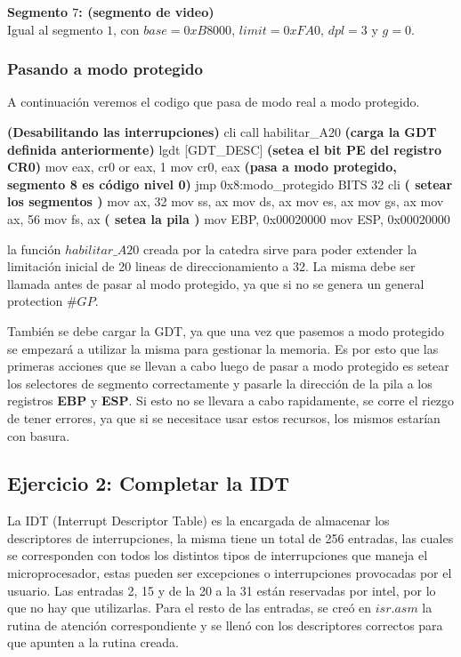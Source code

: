 \documentclass[a4paper,10pt,twoside]{article}
\newenvironment{pseudocodigo}
    {\vspace{0.5em} \begin{algorithmic}}
    {\end{algorithmic} \vspace{0.5em}}
\begin{document}
\textbf{Segmento $7$: (segmento de video)} \\
Igual al segmento $1$, con $base = 0xB8000$, $limit = 0xFA0$, $dpl = 3$ y $g = 0$. \\


\subsubsection{Pasando a modo protegido}

A continuación veremos el codigo que pasa de modo real a modo protegido.

\begin{pseudocodigo}
  \STATE
  \STATE \textbf{(Desabilitando las interrupciones)}
  \STATE cli
  \STATE
  \STATE call habilitar\_A20
  \STATE
  \STATE \textbf{(carga la GDT definida anteriormente)}
  \STATE lgdt [GDT\_DESC]
  \STATE
  \STATE \textbf{(setea el bit PE del registro CR0)}
  \STATE mov eax, cr0
  \STATE or eax, 1
  \STATE mov cr0, eax
  \STATE
  \STATE \textbf{(pasa a modo protegido, segmento 8 es código nivel 0)}
  \STATE jmp 0x8:modo\_protegido
  \STATE BITS 32
  \STATE cli
  \STATE 
  \STATE \textbf{( setear los segmentos )}
  \STATE mov ax, 32
  \STATE mov ss, ax
  \STATE mov ds, ax
  \STATE mov es, ax
  \STATE mov gs, ax
  \STATE mov ax, 56
  \STATE mov fs, ax
  \STATE 
  \STATE \textbf{( setea la pila )}
  \STATE mov EBP, 0x00020000	
  \STATE mov ESP, 0x00020000
\end{pseudocodigo}

la función $habilitar\_A20$ creada por la catedra sirve para poder extender la limitación inicial de 20 lineas de direccionamiento a 32. La misma debe ser llamada antes de pasar al modo protegido, ya que si no se genera un general protection $\#GP$.

También se debe cargar la GDT, ya que una vez que pasemos a modo protegido se empezará a utilizar la misma para gestionar la memoria. Es por esto que las primeras acciones que se llevan a cabo luego de pasar a modo protegido es setear los selectores de segmento correctamente y pasarle la dirección de la pila a los registros \textbf{EBP} y \textbf{ESP}. Si esto no se llevara a cabo rapidamente, se corre el riezgo de tener errores, ya que si se necesitace usar estos recursos, los mismos estarían con basura.

\subsection{Ejercicio 2: Completar la IDT}
La IDT (Interrupt Descriptor Table) es la encargada de almacenar los descriptores de interrupciones, la misma tiene un total de 256 entradas, las cuales se corresponden con todos los distintos tipos de interrupciones que maneja el microprocesador, estas pueden ser excepciones o interrupciones provocadas por el usuario. Las entradas 2, 15 y de la 20 a la 31 están reservadas por intel, por lo que no hay que utilizarlas. Para el resto de las entradas, se creó en $isr.asm$ la rutina de atención correspondiente y se llenó con los descriptores correctos para que apunten a la rutina creada.
\end{document}
